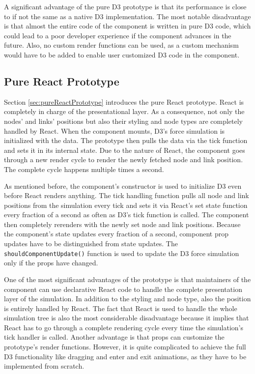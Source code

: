 A significant advantage of the pure D3 prototype is that its performance is close to if not the same as a native D3 implementation. The most notable disadvantage is that almost the entire code of the component is written in pure D3 code, which could lead to a poor developer experience if the component advances in the future. Also, no custom render functions can be used, as a custom mechanism would have to be added to enable user customized D3 code in the component. 

\subsection{Pure React Prototype}

Section \ref{sec:pureReactPrototype} introduces the pure React prototype. React is completely in charge of the presentational layer. As a consequence, not only the nodes' and links' positions but also their styling and node types are completely handled by React. When the component mounts, D3's force simulation is initialized with the data. The prototype then pulls the data via the tick function and sets it in its internal state. Due to the nature of React, the component goes through a new render cycle to render the newly fetched node and link position. The complete cycle happens multiple times a second.

As mentioned before, the component's constructor is used to initialize D3 even before React renders anything. The tick handling function pulls all node and link positions from the simulation every tick and sets it via React's set state function every fraction of a second as often as D3's tick function is called. The component then completely rerenders with the newly set node and link positions. Because the component's state updates every fraction of a second, component prop updates have to be distinguished from state updates. The \texttt{shouldComponentUpdate()} function is used to update the D3 force simulation only if the props have changed.

One of the most significant advantages of the prototype is that maintainers of the component can use declarative React code to handle the complete presentation layer of the simulation. In addition to the styling and node type, also the position is entirely handled by React. The fact that React is used to handle the whole simulation tree is also the most considerable disadvantage because it implies that React has to go through a complete rendering cycle every time the simulation's tick handler is called. Another advantage is that props can customize the prototype's render functions. However, it is quite complicated to achieve the full D3 functionality like dragging and enter and exit animations, as they have to be implemented from scratch. 

